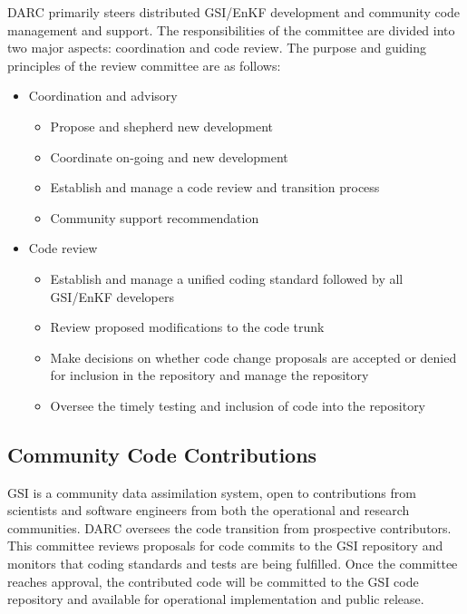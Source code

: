 DARC primarily steers distributed GSI/EnKF development and community code management and support. The responsibilities of the committee are divided into two major aspects: coordination and code review. The purpose and guiding principles of the review committee are as follows:
\begin{itemize}
\item{Coordination and advisory}
\begin{itemize}
\item Propose and shepherd new development
\item Coordinate on-going and new development
\item Establish and manage a code review and transition process
\item Community support recommendation
\end{itemize}
\item{Code review}
\begin{itemize}
\item Establish and manage a unified coding standard followed by all GSI/EnKF developers
\item Review proposed modifications to the code trunk
\item Make decisions on whether code change proposals are accepted or denied for
inclusion in the repository and manage the repository
\item Oversee the timely testing and inclusion of code into the repository
\end{itemize}

\end{itemize}

\subsection{Community Code Contributions}

GSI is a community data assimilation system, open to contributions from scientists and software engineers from both the operational and research communities. DARC oversees the code transition from prospective contributors. This committee reviews proposals for code commits to the GSI repository and monitors that coding standards and tests are being fulfilled. Once the committee reaches approval, the contributed code will be committed to the GSI code repository and available for operational implementation and public release. 

